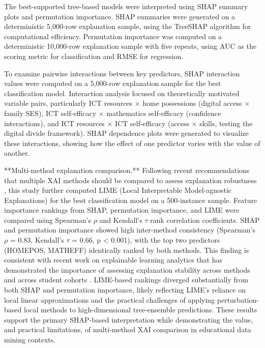 \documentclass[pdflatex,sn-mathphys-ay]{sn-jnl}
\begin{document}
The best-supported tree-based models were interpreted using SHAP summary plots and permutation importance. SHAP summaries were generated on a deterministic 5,000-row explanation sample, using the TreeSHAP algorithm for computational efficiency. Permutation importance was computed on a deterministic 10,000-row explanation sample with five repeats, using AUC as the scoring metric for classification and RMSE for regression.

To examine pairwise interactions between key predictors, SHAP interaction values were computed on a 5,000-row explanation sample for the best classification model. Interaction analysis focused on theoretically motivated variable pairs, particularly ICT resources × home possessions (digital access × family SES), ICT self-efficacy × mathematics self-efficacy (confidence interactions), and ICT resources × ICT self-efficacy (access × skills, testing the digital divide framework). SHAP dependence plots were generated to visualize these interactions, showing how the effect of one predictor varies with the value of another.

**Multi-method explanation comparison.** Following recent recommendations that multiple XAI methods should be compared to assess explanation robustness \citep{Niu_2025}, this study further computed LIME (Local Interpretable Model-agnostic Explanations) \citep{Ribeiro_2016} for the best classification model on a 500-instance sample. Feature importance rankings from SHAP, permutation importance, and LIME were compared using Spearman's $\rho$ and Kendall's $\tau$ rank correlation coefficients. SHAP and permutation importance showed high inter-method consistency (Spearman's $\rho$ = 0.83, Kendall's $\tau$ = 0.66, p < 0.001), with the top two predictors (HOMEPOS, MATHEFF) identically ranked by both methods. This finding is consistent with recent work on explainable learning analytics that has demonstrated the importance of assessing explanation stability across methods and across student cohorts \citep{Tiukhova_2025}. LIME-based rankings diverged substantially from both SHAP and permutation importance, likely reflecting LIME's reliance on local linear approximations and the practical challenges of applying perturbation-based local methods to high-dimensional tree-ensemble predictions. These results support the primary SHAP-based interpretation while demonstrating the value, and practical limitations, of multi-method XAI comparison in educational data mining contexts.
\end{document}
